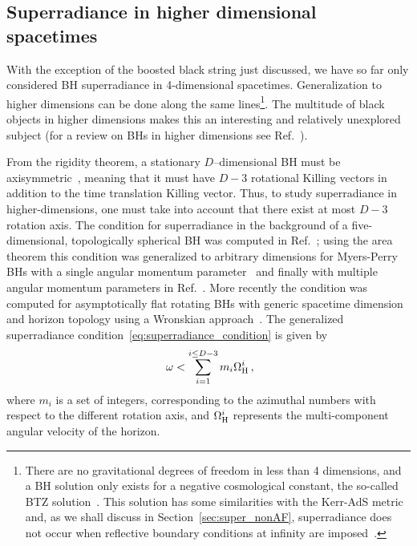 \documentclass[11pt]{article}
\newcommand{\be}{\begin{equation}}
\newcommand{\ee}{\end{equation}}
\numberwithin{equation}{section} %
\begin{document}
\subsection{Superradiance in higher dimensional spacetimes}
With the exception of the boosted black string just discussed, we have so far only considered BH superradiance in 4-dimensional spacetimes. Generalization to higher dimensions can be done along the same lines\footnote{There are no gravitational degrees of freedom in less than 4 dimensions, and a BH solution only exists for a negative cosmological constant, the so-called BTZ solution~\cite{Banados:1992wn}. This solution has some similarities with the Kerr-AdS metric and, as we shall discuss in Section~\ref{sec:super_nonAF}, superradiance does not occur when reflective boundary conditions at infinity are imposed~\cite{Ortiz:2011wd}.}. The multitude of black objects in higher dimensions makes this an interesting and relatively unexplored subject (for a review on BHs in higher dimensions see Ref.~\cite{Emparan:2008eg}). 


 
From the rigidity theorem, a stationary $D$--dimensional BH must be axisymmetric~\cite{Hawking:1971vc,Hollands:2006rj}, meaning that it must have $D-3$ rotational Killing vectors in addition to the time translation Killing vector. Thus, to study superradiance in higher-dimensions, one must take into account that there exist at most $D-3$ rotation axis. The condition for superradiance in the background of a five-dimensional, topologically spherical BH was computed in Ref.~\cite{Frolov:2002xf}; using the area theorem this condition was generalized to arbitrary dimensions for Myers-Perry BHs with a single angular momentum parameter~\cite{Jung:2005cn} and finally with multiple angular momentum parameters in Ref.~\cite{Jung:2005nf}. More recently the condition was computed for asymptotically flat rotating BHs with generic spacetime dimension and horizon topology using a Wronskian approach~\cite{Kodama:2007sf}. The generalized superradiance condition~\eqref{eq:superradiance_condition} is given by
%
\be~\label{eq:superradiance_D_dimensions}
\omega<\sum_{i=1}^{i\leq D-3} m_i \Omega_{\rm H}^i\,, 
\ee
%
where $m_i$ is a set of integers, corresponding to the azimuthal numbers with respect to the different rotation axis, and $\Omega_{\rm H}^i$ represents the multi-component angular velocity of the horizon.
\end{document}
